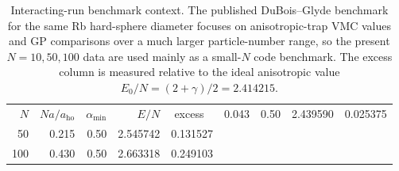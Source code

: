 \begin{table}[t]
\centering
\caption{Interacting-run benchmark context. The published DuBois--Glyde benchmark for the same Rb hard-sphere diameter focuses on anisotropic-trap VMC values and GP comparisons over a much larger particle-number range, so the present $N=10,50,100$ data are used mainly as a small-$N$ code benchmark. The excess column is measured relative to the ideal anisotropic value $E_0/N=(2+\gamma)/2=2.414215$.}
\label{tab:1g-benchmark-context}
\begin{tabular}{rrrrr}
\toprule
$N$ & $Na/a_{\mathrm{ho}}$ & $\alpha_{\min}$ & $E/N$ & excess \
 & 0.043 & 0.50 & 2.439590 & 0.025375 \\
50 & 0.215 & 0.50 & 2.545742 & 0.131527 \\
100 & 0.430 & 0.50 & 2.663318 & 0.249103 \\
\bottomrule
\end{tabular}
\end{table}
